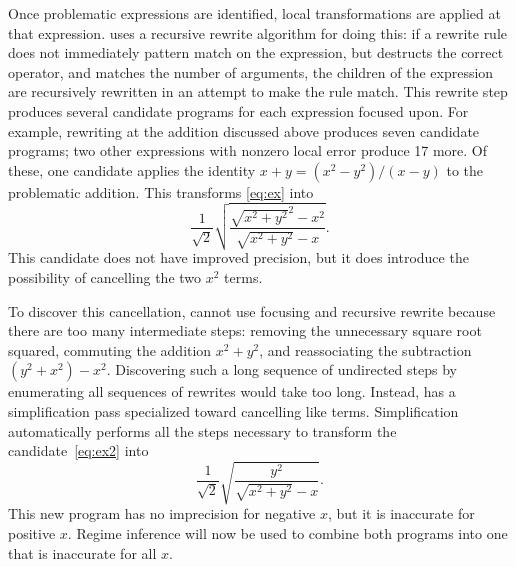 \documentclass[paper.tex]{subfiles}
\begin{document}
Once problematic expressions are identified,
  local transformations are applied at that expression.
\casio uses a recursive rewrite algorithm for doing this:
  if a rewrite rule does not immediately pattern match on the expression,
  but destructs the correct operator,
  and matches the number of arguments,
  the children of the expression are recursively rewritten
  in an attempt to make the rule match.
This rewrite step produces several candidate programs
  for each expression focused upon.
For example, rewriting at the addition discussed above
  produces seven candidate programs;
  two other expressions with nonzero local error produce 17 more.
Of these, one candidate applies the identity
  $x + y = (x^2 - y^2) / (x - y)$ to the problematic addition.
This transforms \eqref{eq:ex} into
\begin{equation} \label{eq:ex2}
  \frac1{\sqrt2} \sqrt{\frac{\sqrt{x^2 + y^2}^2 - x^2}{\sqrt{x^2 + y^2} - x}}.
\end{equation}
This candidate does not have improved precision,
  but it does introduce the possibility
  of cancelling the two $x^2$ terms.

To discover this cancellation,
  \casio cannot use focusing and recursive rewrite
  because there are too many intermediate steps:
  removing the unnecessary square root squared,
  commuting the addition $x^2 + y^2$,
  and reassociating the subtraction $(y^2 + x^2) - x^2$.
Discovering such a long sequence of undirected steps
  by enumerating all sequences of rewrites
  would take too long.
Instead, \casio has a simplification pass
  specialized toward cancelling like terms.
Simplification automatically performs all the steps necessary
  to transform the candidate~\eqref{eq:ex2} into
\begin{equation} \label{eq:ex3}
  \frac1{\sqrt2} \sqrt{\frac{y^2}{\sqrt{x^2 + y^2} - x}}.
\end{equation}
This new program has no imprecision for negative $x$,
  but it is inaccurate for positive $x$.
Regime inference will now be used to combine both programs
  into one that is inaccurate for all $x$.
\end{document}
